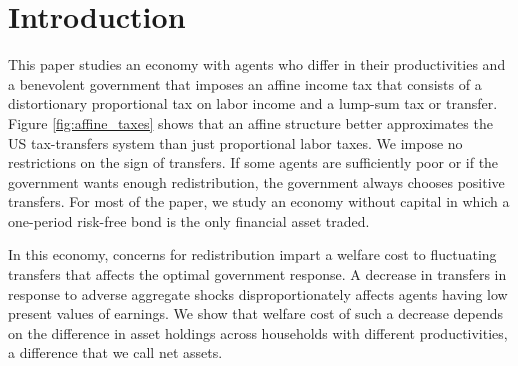 \documentclass[thmsb,11pt]{article}
\begin{document}
\section{Introduction}
%

This paper studies  an economy with  agents who differ in
their productivities and a  benevolent government that imposes an affine income tax that consists of a distortionary proportional
tax on labor income and a lump-sum tax or transfer. Figure \ref{fig:affine_taxes} shows that an affine structure better approximates the US tax-transfers system than just proportional labor taxes.  We
impose no restrictions on the sign of transfers. If some agents are
sufficiently poor or if the government wants enough redistribution, the
government  always chooses positive transfers.
For most of the paper, we  study an economy without capital in
which  a one-period risk-free bond is the only financial asset traded.


In this economy, concerns for redistribution impart a welfare cost to fluctuating transfers that affects the optimal government response. A decrease in transfers in response to adverse aggregate shocks disproportionately affects agents having low present values of earnings. We show that welfare cost of such a decrease depends on the difference in asset holdings across households with different productivities, a difference that we call net assets. 
\end{document}
